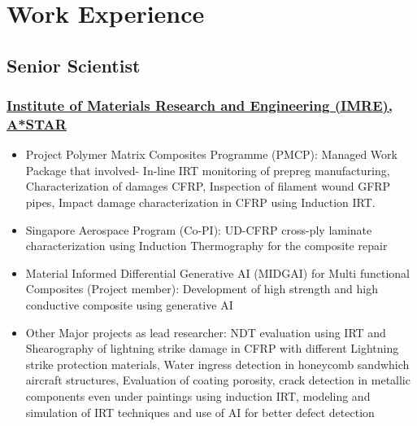 \documentclass{my_cv}%
\begin{document}
\section{Work Experience}
\vspace{1.0em}
\subsection{Senior Scientist}
\subsubsection{\href{https://www.a-star.edu.sg/imre}{Institute of Materials Research and Engineering (IMRE), A*STAR}}
\hypersetup{
    colorlinks=true, %
    linkcolor=mypink, %
    urlcolor=blue,   %
    citecolor=black  %
}
\begin{itemize}[leftmargin=0.15in]
\setlength\itemsep{-0.1em}
\color{mygray}
\item Project Polymer Matrix Composites Programme (PMCP): Managed Work Package that involved- In-line IRT monitoring of prepreg manufacturing, Characterization of damages CFRP, Inspection of filament wound GFRP pipes, Impact damage characterization in CFRP using Induction IRT.
\item Singapore Aerospace Program (Co-PI): UD-CFRP cross-ply laminate characterization using Induction Thermography for the composite repair 
\item Material Informed Differential Generative AI (MIDGAI) for Multi functional Composites (Project member): Development of high strength and high conductive composite using generative AI
\item Other Major projects as lead researcher: NDT evaluation using IRT and Shearography of lightning strike damage in CFRP with different Lightning strike protection materials, Water ingress detection in honeycomb sandwhich aircraft structures, Evaluation of coating porosity, crack detection in metallic components even under paintings using induction IRT, modeling and simulation of IRT techniques and use of AI for better defect detection
\end{itemize}%
{\color{mygray1} \hdashrule[0.1ex]{18.8cm}{0.2mm}{1mm}}
\end{document}
